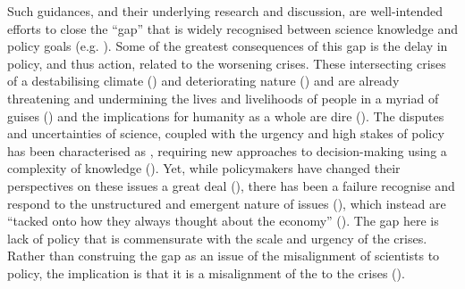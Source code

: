 Such guidances, and their underlying research and discussion, are well-intended efforts to close the ``gap'' that is widely recognised between science knowledge and policy goals (e.g. \cite{RapleyD2014,KarlssonG2020,CairneyTS2023}). Some of the greatest consequences of this gap is the delay in policy, and thus action, related to the worsening \CAN{} crises. These intersecting crises of a destabilising climate (\cite{IIPCC2022}) and deteriorating nature (\cite{IPBES2022}) and are already threatening and undermining the lives and livelihoods of people in a myriad of guises (\cite{TschakertEAKO2019,SpaiserEtAl2024}) and the implications for humanity as a whole are dire (\cite{McKayEtAl2022,WEF2024,SpaiserEtAl2024}). The disputes and uncertainties of \CAN{} science, coupled with the urgency and high stakes of \CAN{} policy has been characterised as \PNS, requiring new approaches to decision-making using a complexity of knowledge (\cite{FuntowiczR1993,Ravetz1999}). Yet, while policymakers have changed their perspectives on these issues a great deal (\cite[p118]{Killick2023}), there has been a failure recognise and respond to the unstructured and emergent nature of \CAN{} issues (\cite{FuntowiczR1993,WesselinkH2020}), which instead are ``tacked onto how they always thought about the economy'' (\cite[p118]{Killick2023}). The gap here is lack of policy that is commensurate with the scale and urgency of the \CAN{} crises. Rather than construing the gap as an issue of the misalignment of scientists to policy, the implication is that it is a misalignment of the \SPI{} to the \CAN{} crises (\cite{BalvaneraJNOBCDGGKKMPSSW2020}).


